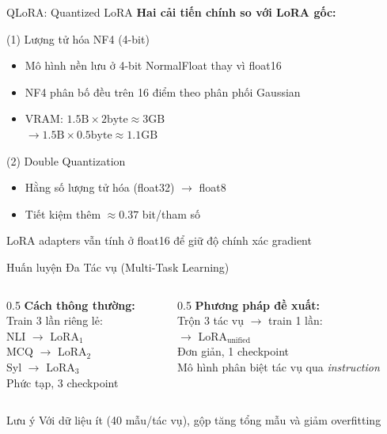 \documentclass{beamer}
\begin{document}
\begin{frame}{QLoRA: Quantized LoRA}
  \textbf{Hai cải tiến chính so với LoRA gốc:}
  \vspace{0.3cm}
  \begin{block}{(1) Lượng tử hóa NF4 (4-bit)}
    \begin{itemize}
      \item Mô hình nền lưu ở 4-bit NormalFloat thay vì float16
      \item NF4 phân bố đều trên 16 điểm theo phân phối Gaussian
      \item VRAM: $1.5\text{B} \times 2\text{byte} \approx 3\text{GB}$\\
        $\to 1.5\text{B} \times 0.5\text{byte} \approx 1.1\text{GB}$
    \end{itemize}
  \end{block}
  \begin{block}{(2) Double Quantization}
    \begin{itemize}
      \item Hằng số lượng tử hóa (float32) $\to$ float8
      \item Tiết kiệm thêm $\approx 0.37$ bit/tham số
    \end{itemize}
  \end{block}
  LoRA adapters vẫn tính ở float16 để giữ độ chính xác gradient
\end{frame}

\begin{frame}{Huấn luyện Đa Tác vụ (Multi-Task Learning)}
  \begin{columns}
    \begin{column}{0.5\textwidth}
      \textbf{Cách thông thường:}\\
      Train 3 lần riêng lẻ:\\
      NLI $\to$ LoRA$_1$\\
      MCQ $\to$ LoRA$_2$\\
      Syl $\to$ LoRA$_3$\\[6pt]
      Phức tạp, 3 checkpoint
    \end{column}
    \begin{column}{0.5\textwidth}
      \textbf{Phương pháp đề xuất:}\\
      Trộn 3 tác vụ $\to$ train 1 lần:\\
      [NLI + MCQ + Syl] $\to$ LoRA$_{\text{unified}}$\\[6pt]
      Đơn giản, 1 checkpoint\\
      Mô hình phân biệt tác vụ qua \textit{instruction}
    \end{column}
  \end{columns}
  \vspace{0.4cm}
  \begin{alertblock}{Lưu ý}
    Với dữ liệu ít (40 mẫu/tác vụ), gộp tăng tổng mẫu và giảm overfitting
  \end{alertblock}
\end{frame}
\end{document}
